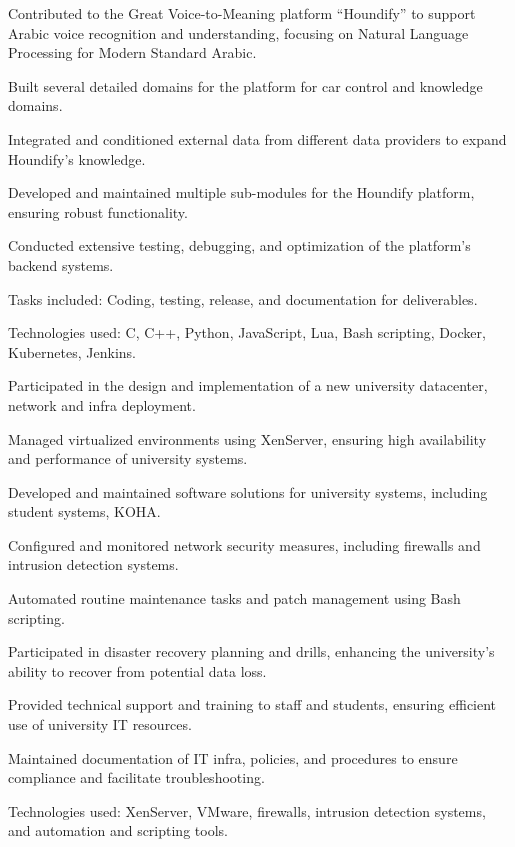 \begin{resume_list}
    \item Contributed to the Great Voice-to-Meaning platform “Houndify” to support Arabic voice recognition and understanding, focusing on Natural Language Processing for Modern Standard Arabic.
    \item Built several detailed domains for the platform for car control and knowledge domains.
    \item Integrated and conditioned external data from different data providers to expand Houndify's knowledge.
    \item Developed and maintained multiple sub-modules for the Houndify platform, ensuring robust functionality.
    \item Conducted extensive testing, debugging, and optimization of the platform's backend systems.
    \item Tasks included: Coding, testing, release, and documentation for deliverables.
    \item Technologies used: C, C++, Python, JavaScript, Lua, Bash scripting, Docker, Kubernetes, Jenkins.
\end{resume_list}

\begin{resume_list}
    \item Participated in the design and implementation of a new university datacenter, network and infra deployment.
    \item Managed virtualized environments using XenServer, ensuring high availability and performance of university systems.
    \item Developed and maintained software solutions for university systems, including student systems, KOHA.
    \item Configured and monitored network security measures, including firewalls and intrusion detection systems.
    \item Automated routine maintenance tasks and patch management using Bash scripting.
    \item Participated in disaster recovery planning and drills, enhancing the university’s ability to recover from potential data loss.
    \item Provided technical support and training to staff and students, ensuring efficient use of university IT resources.
    \item Maintained documentation of IT infra, policies, and procedures to ensure compliance and facilitate troubleshooting.
    \item Technologies used: XenServer, VMware, firewalls, intrusion detection systems, and automation and scripting tools.
\end{resume_list}